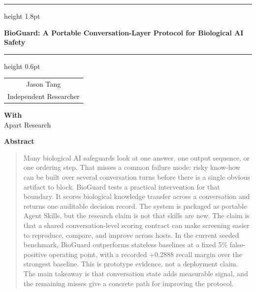 \documentclass[11pt]{article}
\begin{document}
\vspace*{0.2in}
\hrule height 1.8pt
\vspace{0.45in}
\begin{center}
{\LARGE\bfseries BioGuard: A Portable Conversation-Layer Protocol for Biological AI Safety\footnotemark[1] \par}
\end{center}
\vspace{0.3in}
\hrule height 0.6pt
\vspace{0.5in}


\begin{center}
\begin{tabular}{c}
    Jason Tang \\
    Independent Researcher \\
\end{tabular}

\vspace{0.2in}
\textbf{With}\\
Apart Research
\end{center}

\vspace{0.35in}

\begin{center}
{\large\bfseries Abstract}
\end{center}
\vspace{0.12in}
\begin{quote}
Many biological AI safeguards look at one answer, one output sequence, or one ordering step. That misses a common failure mode: risky know-how can be built over several conversation turns before there is a single obvious artifact to block. BioGuard tests a practical intervention for that boundary. It scores biological knowledge transfer across a conversation and returns one auditable decision record. The system is packaged as portable Agent Skills, but the research claim is not that skills are new. The claim is that a shared conversation-level scoring contract can make screening easier to reproduce, compare, and improve across hosts. In the current seeded benchmark, BioGuard outperforms stateless baselines at a fixed 5\% false-positive operating point, with a recorded +0.2888 recall margin over the strongest baseline. This is prototype evidence, not a deployment claim. The main takeaway is that conversation state adds measurable signal, and the remaining misses give a concrete path for improving the protocol.
\end{quote}
\end{document}

